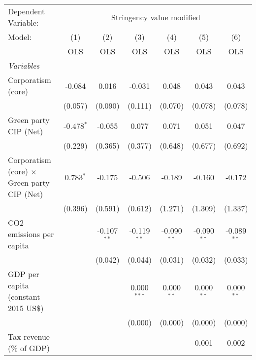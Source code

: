 
\begingroup
\centering
\begin{tabular}{lcccccc}
   \toprule
   Dependent Variable: & \multicolumn{6}{c}{Stringency value modified}\\
   Model:                                             & (1)          & (2)           & (3)           & (4)           & (5)           & (6)\\  
                                                      &  OLS         & OLS           & OLS           & OLS           & OLS           & OLS\\  
   \midrule
   \emph{Variables}\\
   Corporatism (core)                                 & -0.084       & 0.016         & -0.031        & 0.048         & 0.043         & 0.043\\   
                                                      & (0.057)      & (0.090)       & (0.111)       & (0.070)       & (0.078)       & (0.078)\\   
   Green party CIP (Net)                              & -0.478$^{*}$ & -0.055        & 0.077         & 0.071         & 0.051         & 0.047\\   
                                                      & (0.229)      & (0.365)       & (0.377)       & (0.648)       & (0.677)       & (0.692)\\   
   Corporatism (core) $\times$ Green party CIP (Net)  & 0.783$^{*}$  & -0.175        & -0.506        & -0.189        & -0.160        & -0.172\\   
                                                      & (0.396)      & (0.591)       & (0.612)       & (1.271)       & (1.309)       & (1.337)\\   
   CO2 emissions per capita                           &              & -0.107$^{**}$ & -0.119$^{**}$ & -0.090$^{**}$ & -0.090$^{**}$ & -0.089$^{**}$\\   
                                                      &              & (0.042)       & (0.044)       & (0.031)       & (0.032)       & (0.033)\\   
   GDP per capita (constant 2015 US\$)                &              &               & 0.000$^{***}$ & 0.000$^{**}$  & 0.000$^{**}$  & 0.000$^{**}$\\   
                                                      &              &               & (0.000)       & (0.000)       & (0.000)       & (0.000)\\   
   Tax revenue (\% of GDP)                            &              &               &               &               & 0.001         & 0.002\\   

\end{tabular}
